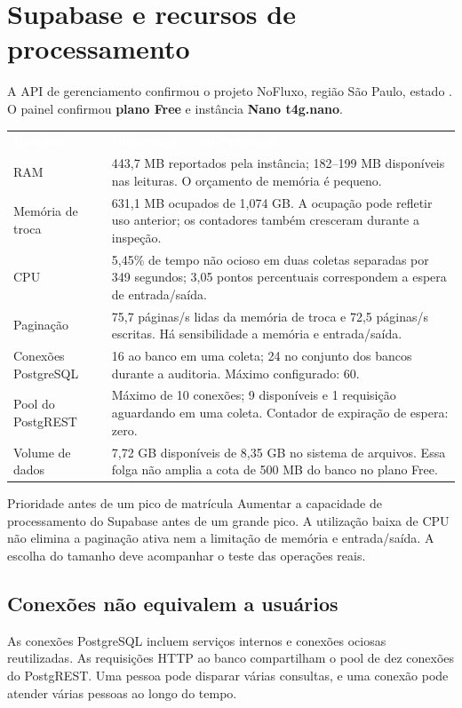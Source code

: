 \documentclass[10pt,a4paper]{article}
\newcommand{\code}[1]{{\ttfamily\footnotesize\detokenize{#1}}}
\newcommand{\headcell}[1]{\textcolor{white}{\bfseries #1}}
\newcommand{\pagechapter}[1]{\clearpage\section{#1}}
\begin{document}
\pagechapter{Supabase e recursos de processamento}
A API de gerenciamento confirmou o projeto NoFluxo, região São Paulo, estado \code{ACTIVE_HEALTHY}. O painel confirmou \textbf{plano Free} e instância \textbf{Nano t4g.nano}.

\begingroup\small\renewcommand{\arraystretch}{1.28}
\par\noindent\begin{tabularx}{\linewidth}{@{}L{29mm}Y@{}}
\headcell{Recurso}&\headcell{Observação e interpretação}\\
RAM&443,7 MB reportados pela instância; 182–199 MB disponíveis nas leituras. O orçamento de memória é pequeno.\\
Memória de troca&631,1 MB ocupados de 1,074 GB. A ocupação pode refletir uso anterior; os contadores também cresceram durante a inspeção.\\
CPU&5,45\% de tempo não ocioso em duas coletas separadas por 349 segundos; 3,05 pontos percentuais correspondem a espera de entrada/saída.\\
Paginação&75,7 páginas/s lidas da memória de troca e 72,5 páginas/s escritas. Há sensibilidade a memória e entrada/saída.\\
Conexões PostgreSQL&16 ao banco \code{postgres} em uma coleta; 24 no conjunto dos bancos durante a auditoria. Máximo configurado: 60.\\
Pool do PostgREST&Máximo de 10 conexões; 9 disponíveis e 1 requisição aguardando em uma coleta. Contador de expiração de espera: zero.\\
Volume de dados&7,72 GB disponíveis de 8,35 GB no sistema de arquivos. Essa folga não amplia a cota de 500 MB do banco no plano Free.\\
\end{tabularx}\endgroup

\begin{NFBox}{Prioridade antes de um pico de matrícula}
Aumentar a capacidade de processamento do Supabase antes de um grande pico. A utilização baixa de CPU não elimina a paginação ativa nem a limitação de memória e entrada/saída. A escolha do tamanho deve acompanhar o teste das operações reais.
\end{NFBox}

\subsection{Conexões não equivalem a usuários}
As conexões PostgreSQL incluem serviços internos e conexões ociosas reutilizadas. As requisições HTTP ao banco compartilham o pool de dez conexões do PostgREST. Uma pessoa pode disparar várias consultas, e uma conexão pode atender várias pessoas ao longo do tempo.
\end{document}
